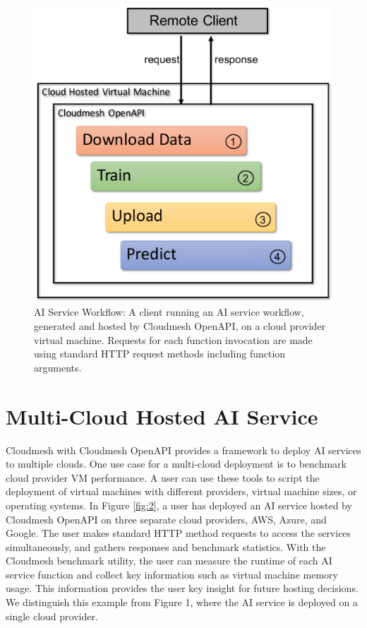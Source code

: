 \begin{figure}[htb]
\centering

\includegraphics[width=0.7\columnwidth]{paper/images/architecture-openapi-1.pdf}

\caption{AI Service Workflow: A client running an AI service workflow, generated
and hosted by Cloudmesh OpenAPI, on a cloud provider virtual machine.
Requests for each function invocation are made using standard HTTP
request methods including function arguments.
}
\label{fig:1}
\end{figure}


\section{Multi-Cloud Hosted AI
Service}\label{multi-cloud-hosted-ai-service}

Cloudmesh with Cloudmesh OpenAPI provides a framework to deploy AI
services to multiple clouds. One use case for a multi-cloud deployment
is to benchmark cloud provider VM performance. A user can use these
tools to script the deployment of virtual machines with different
providers, virtual machine sizes, or operating systems. In Figure \ref{fig:2}, a
user has deployed an AI service hosted by Cloudmesh OpenAPI on three
separate cloud providers, AWS, Azure, and Google. The user makes
standard HTTP method requests to access the services simultaneously, and
gathers responses and benchmark statistics. With the Cloudmesh benchmark
utility, the user can measure the runtime of each AI service function
and collect key information such as virtual machine memory usage. This
information provides the user key insight for future hosting decisions.
We distinguish this example from Figure 1, where the AI service is
deployed on a single cloud provider.

